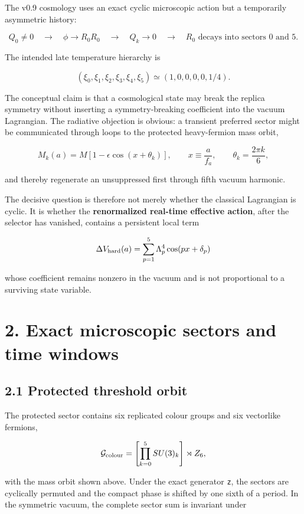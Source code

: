 \documentclass[
  10pt,
  a4paper,
]{article}
\begin{document}
The v0.9 cosmology uses an exact cyclic microscopic action but a
temporarily asymmetric history:

\[
Q_0\ne0
\quad\longrightarrow\quad
\phi\to R_0R_0
\quad\longrightarrow\quad
Q_k\to0
\quad\longrightarrow\quad
R_0\text{ decays into sectors }0\text{ and }5.
\]

The intended late temperature hierarchy is

\[
(\xi_0,\xi_1,\xi_2,\xi_3,\xi_4,\xi_5)
\simeq
(1,0,0,0,0,1/4).
\]

The conceptual claim is that a cosmological state may break the replica
symmetry without inserting a symmetry-breaking coefficient into the
vacuum Lagrangian. The radiative objection is obvious: a transient
preferred sector might be communicated through loops to the protected
heavy-fermion mass orbit,

\[
M_k(a)=M\left[1-\epsilon\cos\left(x+\theta_k\right)\right],
\qquad
x\equiv\frac{a}{f_a},
\qquad
\theta_k=\frac{2\pi k}{6},
\]

and thereby regenerate an unsuppressed first through fifth vacuum
harmonic.

The decisive question is therefore not merely whether the classical
Lagrangian is cyclic. It is whether the \textbf{renormalized real-time
effective action}, after the selector has vanished, contains a
persistent local term

\[
\Delta V_{\rm hard}(a)
=
\sum_{p=1}^{5}
\Lambda_p^4\cos(px+\delta_p)
\]

whose coefficient remains nonzero in the vacuum and is not proportional
to a surviving state variable.

\section{2. Exact microscopic sectors and time
windows}\label{exact-microscopic-sectors-and-time-windows}

\subsection{2.1 Protected threshold
orbit}\label{protected-threshold-orbit}

The protected sector contains six replicated colour groups and six
vectorlike fermions,

\[
\mathcal G_{\rm colour}
=
\left[\prod_{k=0}^{5}SU(3)_k\right]\rtimes Z_6,
\]

with the mass orbit shown above. Under the exact generator \texttt{z},
the sectors are cyclically permuted and the compact phase is shifted by
one sixth of a period. In the symmetric vacuum, the complete sector sum
is invariant under
\end{document}
